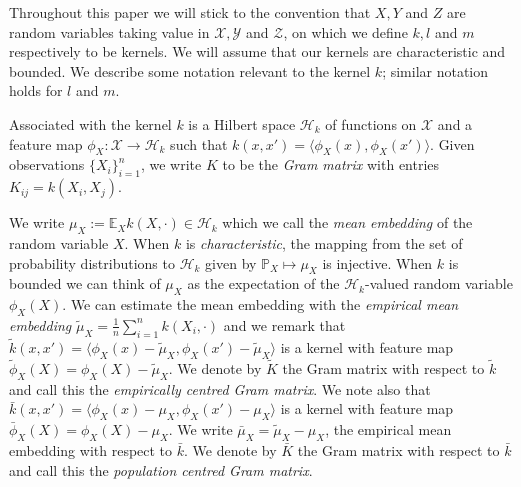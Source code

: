 \documentclass[]{article}
\begin{document}

Throughout this paper we will stick to the convention that $X,Y$ and $Z$ are random variables taking value in $\mathcal{X}, \mathcal{Y}$ and $\mathcal{Z}$, on which we define $k, l$ and $m$ respectively to be kernels. We will assume that our kernels are characteristic and bounded. We describe some notation relevant to the kernel $k$; similar notation holds for $l$ and $m$.

Associated with the kernel $k$ is a Hilbert space $\mathcal{H}_k$ of functions on $\mathcal{X}$ and a feature map $\phi_X:\mathcal{X}\longrightarrow\mathcal{H}_k$ such that $k(x,x') = \langle \phi_X(x),\phi_X(x')\rangle$. Given observations $\{X_i\}_{i=1}^n$, we write $K$ to be the \emph{Gram matrix} with entries $K_{ij} = k(X_i,X_j)$.  

We write $\mu_X := \mathbb{E}_X k(X,\cdot) \in \mathcal{H}_k$ which we call the \emph{mean embedding} of the random variable $X$. When $k$ is \emph{characteristic}, the mapping from the set of probability distributions to $\mathcal{H}_k$ given by $\mathbb{P}_X \mapsto \mu_X$ is injective. When $k$ is bounded we can think of $\mu_X$ as the expectation of the $\mathcal{H}_k$-valued random variable $\phi_X(X)$. We can estimate the mean embedding with the \emph{empirical mean embedding} $\tilde{\mu}_X = \frac{1}{n}\sum_{i=1}^n k(X_i,\cdot)$ and we remark that $\tilde{k}(x,x') = \langle\phi_X(x)-\tilde{\mu}_X,\phi_X(x')-\tilde{\mu}_X\rangle$ is a kernel with feature map $\tilde{\phi}_X(X) = \phi_X(X) - \tilde{\mu}_X$. We denote by $\tilde{K}$ the Gram matrix with respect to $\tilde{k}$ and call this the \emph{empirically centred Gram matrix}. We note also that $\bar{k}(x,x') = \langle\phi_X(x)-\mu_X,\phi_X(x')-\mu_X\rangle$ is a kernel with feature map $\bar{\phi}_X(X) = \phi_X(X) - \mu_X$. We write $\bar\mu_X = \tilde\mu_X - \mu_X$, the empirical mean embedding with respect to $\bar{k}$. We denote by $\bar{K}$ the Gram matrix with respect to $\bar{k}$ and call this the \emph{population centred Gram matrix}. 
\end{document}
